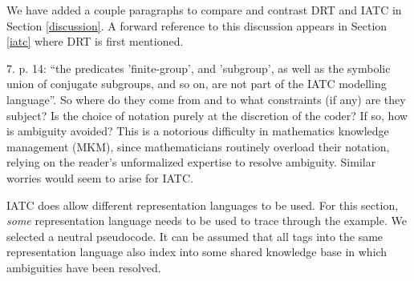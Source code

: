 We have added a couple paragraphs to compare and contrast DRT and IATC in Section \ref{discussion}.
A forward reference to this discussion appears in Section \ref{iatc} where DRT is first mentioned.


\begin{mdframed}[backgroundcolor=orange!10]
7. p. 14: ``the predicates 'finite-group', and 'subgroup', as well as the symbolic union of conjugate subgroups, and so on, are not part of the IATC modelling language''. So where do they come from and to what constraints (if any) are they subject? Is the choice of notation purely at the discretion of the coder? If so, how is ambiguity avoided? This is a notorious difficulty in mathematics knowledge management (MKM), since mathematicians routinely overload their notation, relying on the reader's unformalized expertise to resolve ambiguity. Similar worries would seem to arise for IATC.
\end{mdframed}


IATC does allow different representation languages to be used.  For this section, \emph{some} representation language needs to be used to trace through the example.  We selected a neutral pseudocode.  It can be assumed that all tags into the same representation language also index into some shared knowledge base in which ambiguities have been resolved.


